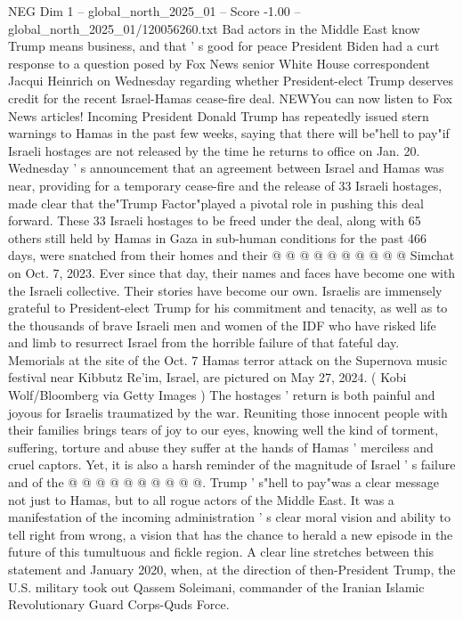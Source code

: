 \begin{textsample}{NEG Dim 1 – global\_north\_2025\_01 – Score -1.00 – global\_north\_2025\_01/120056260.txt}  \label{ex:f1_neg_084}
Bad actors in the Middle East know Trump means business, and that ' s good for peace President Biden had a curt response to a question posed by Fox News senior White House correspondent Jacqui Heinrich on Wednesday regarding whether President-elect Trump deserves credit for the recent Israel-Hamas cease-fire deal.
NEWYou can now listen to Fox News articles!
Incoming President Donald Trump has repeatedly issued stern warnings to Hamas in the past few weeks, saying that there will be"hell to pay"if Israeli hostages are not released by the time he returns to office on Jan. 20.
Wednesday ' s announcement that an agreement between Israel and Hamas was near, providing for a temporary cease-fire and the release of 33 Israeli hostages, made clear that the"Trump Factor"played a pivotal role in pushing this deal forward.
These 33 Israeli hostages to be freed under the deal, along with 65 others still held by Hamas in Gaza in sub-human conditions for the past 466 days, were snatched from their homes and their @ @ @ @ @ @ @ @ @ @ Simchat on Oct. 7, 2023.
Ever since that day, their names and faces have become one with the Israeli collective.
Their stories have become our own.
Israelis are immensely grateful to President-elect Trump for his commitment and tenacity, as well as to the thousands of brave Israeli men and women of the IDF who have risked life and limb to resurrect Israel from the horrible failure of that fateful day.
Memorials at the site of the Oct. 7 Hamas terror attack on the Supernova music festival near Kibbutz Re'im, Israel, are pictured on May 27, 2024. ( Kobi Wolf/Bloomberg via Getty Images ) The hostages ' return is both painful and joyous for Israelis traumatized by the war.
Reuniting those innocent people with their families brings tears of joy to our eyes, knowing well the kind of torment, suffering, torture and abuse they suffer at the hands of Hamas ' merciless and cruel captors.
Yet, it is also a harsh reminder of the magnitude of Israel ' s failure and of the @ @ @ @ @ @ @ @ @ @.
Trump ' s"hell to pay"was a clear message not just to Hamas, but to all rogue actors of the Middle East.
It was a manifestation of the incoming administration ' s clear moral vision and ability to tell right from wrong, a vision that has the chance to herald a new episode in the future of this tumultuous and fickle region.
A clear line stretches between this statement and January 2020, when, at the direction of then-President Trump, the U.S. military took out Qassem Soleimani, commander of the Iranian Islamic Revolutionary Guard Corps-Quds Force.

\end{textsample}
